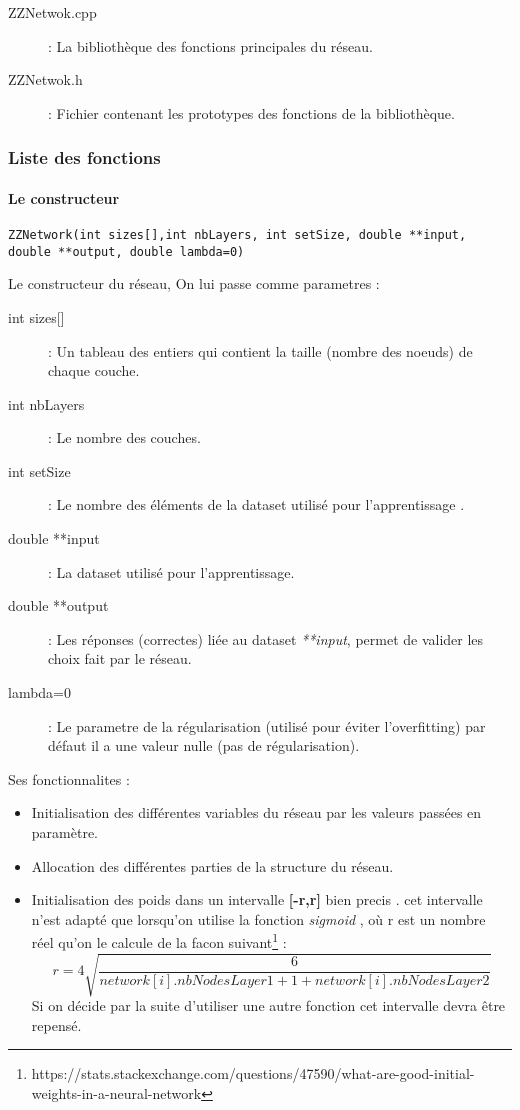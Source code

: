 \begin{description}
\item[ZZNetwok.cpp] : La bibliothèque des fonctions principales du réseau.
\item[ZZNetwok.h] : Fichier contenant les prototypes des fonctions de la bibliothèque.
\end{description}
\subsubsection{Liste des fonctions}

\paragraph{Le constructeur}
\begin{verbatim}
ZZNetwork(int sizes[],int nbLayers, int setSize, double **input, double **output, double lambda=0)
\end{verbatim}
Le constructeur du réseau, On lui passe comme parametres :
	\begin{description}
		\item[{int sizes[]}] : Un tableau des entiers qui contient la taille (nombre des noeuds) de chaque couche.
        \item[int nbLayers] : Le nombre des couches.
        \item[int setSize] : Le nombre des éléments de la dataset utilisé pour l'apprentissage .
        \item[double **input] : La dataset utilisé pour l'apprentissage.
        \item[double **output] : Les réponses (correctes) liée au dataset \textit{**input}, permet de valider les choix fait par le réseau.
        \item[lambda=0] : Le parametre de la régularisation (utilisé pour éviter l'overfitting) par défaut il a une valeur nulle (pas de régularisation).
	\end{description}

Ses fonctionnalites :
\begin{itemize}
\item Initialisation des différentes variables du réseau par les valeurs passées en paramètre.
\item Allocation des différentes parties de la structure du réseau.
\item Initialisation des poids dans un intervalle \textbf{[-r,r]} bien precis . cet intervalle n'est adapté que lorsqu'on utilise la fonction \textit{sigmoid} , où r est un nombre réel qu'on le calcule de la facon suivant\footnote{https://stats.stackexchange.com/questions/47590/what-are-good-initial-weights-in-a-neural-network} :
\begin{equation}
     r = 4\sqrt{\frac{6}{network[i].nbNodesLayer1 + 1 + network[i].nbNodesLayer2}}
\end{equation}
Si on décide par la suite d'utiliser une autre fonction cet intervalle devra être repensé.
\end{itemize}

